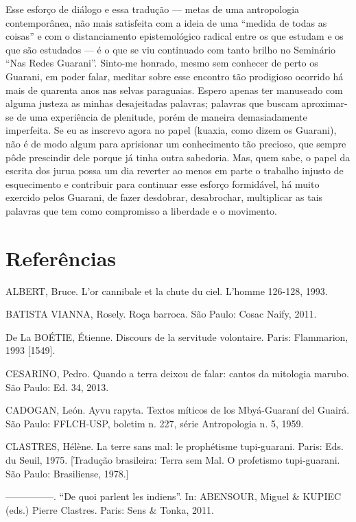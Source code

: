 \documentclass{article}
\begin{document}
Esse esfor\c{c}o de di\'alogo e essa tradu\c{c}\~ao --- metas de uma
antropologia contempor\^anea, n\~ao mais satisfeita com a ideia de uma
{\textquotedblleft}medida de todas as coisas{\textquotedblright} e com
o distanciamento epistemol\'ogico radical entre os que estudam e os que
s\~ao estudados --- \'e o que se viu continuado com tanto brilho no
Semin\'ario {\textquotedblleft}Nas Redes Guarani{\textquotedblright}.
Sinto-me honrado, mesmo sem conhecer de perto os Guarani, em poder
falar, meditar sobre esse encontro t\~ao prodigioso ocorrido h\'a mais
de quarenta anos nas selvas paraguaias. Espero apenas ter manuseado com
alguma justeza as minhas desajeitadas palavras; palavras que buscam
aproximar-se de uma experi\^encia de plenitude, por\'em de maneira
demasiadamente imperfeita. Se eu as inscrevo agora no papel (kuaxia,
como dizem os Guarani), n\~ao \'e de modo algum para aprisionar um
conhecimento t\~ao precioso, que sempre p\^ode prescindir dele porque
j\'a tinha outra sabedoria. Mas, quem sabe, o papel da escrita dos
jurua possa um dia reverter ao menos em parte o trabalho injusto de
esquecimento e contribuir para continuar esse esfor\c{c}o formid\'avel,
h\'a muito exercido pelos Guarani, de fazer desdobrar, desabrochar,
multiplicar as tais palavras que tem como compromisso a liberdade e o
movimento.

\section[Refer\^encias ]{Refer\^encias }
ALBERT, Bruce. L{\textquoteright}or cannibale et la chute du ciel.
L{\textquoteright}homme 126-128, 1993.

BATISTA VIANNA, Rosely. Ro\c{c}a barroca. S\~ao Paulo: Cosac Naify,
2011.

De La BO\'ETIE, \'Etienne. Discours de la servitude volontaire. Paris:
Flammarion, 1993 [1549].

CESARINO, Pedro. Quando a terra deixou de falar: cantos da mitologia
marubo. S\~ao Paulo: Ed. 34, 2013.

CADOGAN, Le\'on. Ayvu rapyta. Textos m\'iticos de los Mby\'a-Guaran\'i
del Guair\'a. S\~ao Paulo: FFLCH-USP, boletim n. 227, s\'erie
Antropologia n. 5, 1959.

CLASTRES, H\'el\`ene. La terre sans mal: le proph\'etisme tupi-guarani.
Paris: Eds. du Seuil, 1975. [Tradu\c{c}\~ao brasileira: Terra sem Mal.
O profetismo tupi-guarani. S\~ao Paulo: Brasiliense, 1978.]

{}---{}---{}---{}---{}---. {\textquotedblleft}De quoi parlent les
indiens{\textquotedblright}. In: ABENSOUR, Miguel \& KUPIEC (eds.)
Pierre Clastres. Paris: Sens \& Tonka, 2011.
\end{document}

